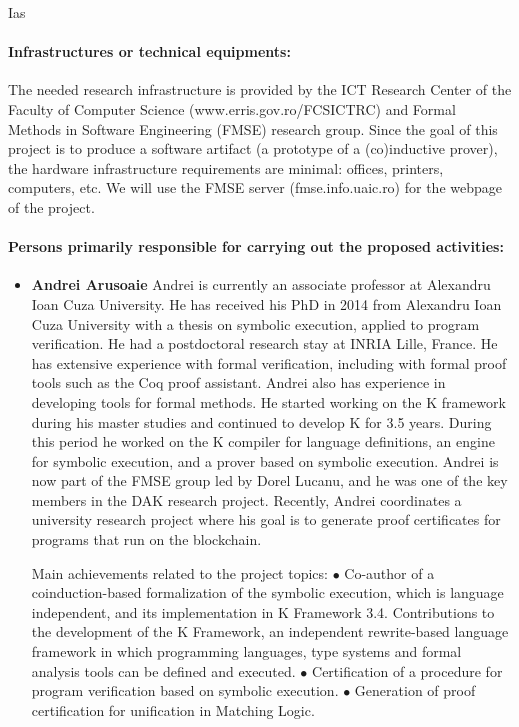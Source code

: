\begin{sitedescription}{Ias}
\paragraph{Infrastructures or technical equipments:}

The needed research infrastructure is provided by the ICT Research Center of the Faculty of Computer Science (www.erris.gov.ro/FCSICTRC) and Formal Methods in Software Engineering (FMSE) research group. Since the goal of this project is to produce a software artifact (a prototype of a (co)inductive prover), the hardware infrastructure requirements are minimal: offices, printers, computers, etc. We will use the FMSE server (fmse.info.uaic.ro) for the webpage of the project. 

\paragraph{Persons primarily responsible for carrying out the proposed activities:}

\begin{itemize} %
\item{\bf Andrei Arusoaie}
Andrei is currently an associate professor at Alexandru Ioan Cuza University. He has received his PhD in 2014 from Alexandru Ioan Cuza University with a thesis on symbolic execution, applied to program verification. He had a postdoctoral research stay at INRIA Lille, France. He has extensive experience with formal verification, including with formal proof tools such as the Coq proof assistant. Andrei also has experience in developing tools for formal methods. He started working on the K framework during his master studies and continued to develop K for 3.5 years. During this period he worked on the K compiler for language definitions, an engine for symbolic execution, and a prover based on symbolic execution. 
Andrei is now part of the FMSE group led by Dorel Lucanu, and he was one of the key members in the DAK research project. Recently, Andrei coordinates a university  research project where his goal is to generate proof certificates for programs that run on the blockchain.

Main achievements related to the project topics:
$\bullet$ Co-author of a coinduction-based formalization of the symbolic execution, which is language independent, and its implementation in K Framework 3.4.
Contributions to the development of the K Framework, an independent rewrite-based language framework in which programming languages, type systems and formal analysis tools can be defined and executed.
$\bullet$ Certification of a procedure for program verification based on symbolic execution.
$\bullet$ Generation of proof certification for unification in Matching Logic.


\end{itemize}
\end{sitedescription}
